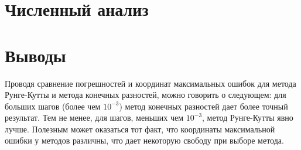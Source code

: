 \documentclass{article}
\begin{document}
	\section{Численный анализ}	
	
	\section{Выводы}
	\begin{comment}
	Задача Коши и краевая задача - два частых явления, возникаюзих как результат обработки некоторой физической или математической модели. В основе каждой из них лежит идея решения ОДУ. Погрешности же решений в случае вышеупомянутых методов различаются, что является поводом к тому, чтобы понять, к какой лучше задаче сводить модель. К примеру, если отрезок, на котором необходимо вычислить решение ОДУ, велик, и не требуется точность более чем $10^{-3}$, то ресурсов на решение краевой задачи потребуется меньше, чем на решение задачи Коши при прочих равных. Тем не менее, если же требуется более высокая точность, то в рекомендацию всупает уже метод Рунге-Кутты 4 порядка и соответствующая ему задача Коши.
	\end{comment}
	
	
	Проводя сравнение погрешностей и координат максимальных ошибок для метода Рунге-Кутты и метода конечных разностей, можно говорить о следующем: для больших шагов (более чем $10^{-3}$) метод конечных разностей дает более точный результат. Тем не менее, для шагов, меньших чем $10^{-3}$, метод Рунге-Кутты явно лучше. Полезным может оказаться тот факт, что координаты максимальной ошибки у методов различны, что дает некоторую свободу при выборе метода.
\end{document}
